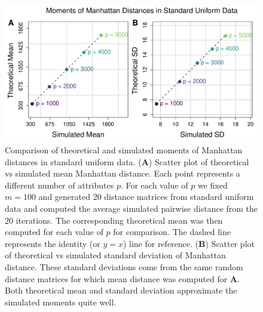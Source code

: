 \documentclass[10pt,letterpaper]{article}\usepackage[]{graphicx}\usepackage[]{color}
\begin{document}
\begin{figure}[H]
	\includegraphics[width=\textwidth]{compared_moments_uniform_manhattan_standard.pdf}
	\caption{Comparison of theoretical and simulated moments of Manhattan distances in standard uniform data. (\textbf{A}) Scatter plot of theoretical vs simulated mean Manhattan distance. Each point represents a different number of attributes $p$. For each value of $p$ we fixed $m=100$ and generated 20 distance matrices from standard uniform data and computed the average simulated pairwise distance from the 20 iterations. The corresponding theoretical mean was then computed for each value of $p$ for comparison. The dashed line represents the identity (or $y=x$) line for reference. (\textbf{B}) Scatter plot of theoretical vs simulated standard deviation of Manhattan distance. These standard deviations come from the same random distance matrices for which mean distance was computed for \textbf{A}. Both theoretical mean and standard deviation approximate the simulated moments quite well.}
\end{figure}
\end{document}
